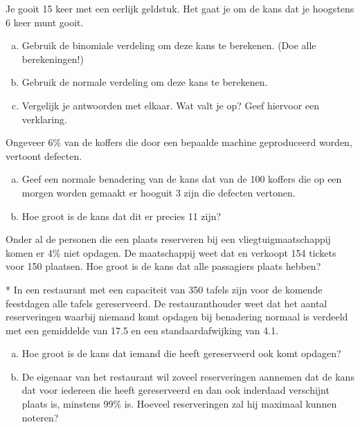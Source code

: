 \documentclass[a4paper,12pt, twoside]{article}
\begin{document}
\begin{oefening}
Je gooit 15 keer met een eerlijk geldstuk. Het gaat je om de kans dat je hoogstens 6 keer munt gooit.
\begin{enumerate}[(a)]
  \item Gebruik de binomiale verdeling om deze kans te berekenen. (Doe alle berekeningen!)
  \item Gebruik de normale verdeling om deze kans te berekenen.
  \item Vergelijk je antwoorden met elkaar. Wat valt je op? Geef hiervoor een verklaring.
\end{enumerate}
\end{oefening}

\begin{oefening}
Ongeveer 6\% van de koffers die door een bepaalde machine geproduceerd worden, vertoont defecten.
\begin{enumerate}[(a)]
  \item Geef een normale benadering van de kans dat van de 100 koffers die op een morgen worden gemaakt er hooguit 3 zijn die defecten vertonen.
  \item Hoe groot is de kans dat dit er precies 11 zijn?
\end{enumerate}
\end{oefening}

\begin{oefening}
Onder al de personen die een plaats reserveren bij een vliegtuigmaatschappij komen er 4\% niet opdagen. De maatschappij weet dat en verkoopt 154 tickets voor 150 plaatsen. Hoe groot is de kans dat alle passagiers plaats hebben?
\end{oefening}

\begin{oefening}*
In een restaurant met een capaciteit van 350 tafels zijn voor de komende feestdagen alle tafels gereserveerd. De restauranthouder weet dat het aantal reserveringen waarbij niemand komt opdagen bij benadering normaal is verdeeld met een gemiddelde van 17.5 en een standaardafwijking van 4.1.
\begin{enumerate}[(a)]
  \item Hoe groot is de kans dat iemand die heeft gereserveerd ook komt opdagen?
  \item De eigenaar van het restaurant wil zoveel reserveringen aannemen dat de kans dat voor iedereen die heeft gereserveerd en dan ook inderdaad verschijnt plaats is, minstens 99\% is. Hoeveel reserveringen zal hij maximaal kunnen noteren?
\end{enumerate}
\end{oefening}
\end{document}
